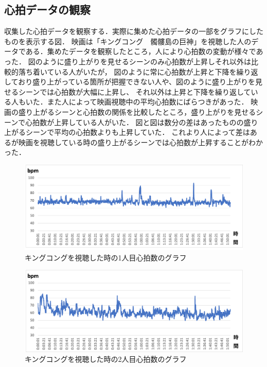 \subsection{心拍データの観察}

収集した心拍データを観察する．実際に集めた心拍データの一部をグラフにしたものを表示する図．
映画は「キングコング　髑髏島の巨神」を視聴した人のデータである．集めたデータを観察したところ，人により心拍数の変動が様々であった．
図のように盛り上がりを見せるシーンのみ心拍数が上昇しそれ以外は比較的落ち着いている人がいたが，
図のように常に心拍数が上昇と下降を繰り返しており盛り上がっている箇所が把握できない人や、図のように盛り上がりを見せるシーンでは心拍数が大幅に上昇し、
それ以外は上昇と下降を繰り返している人もいた．また人によって映画視聴中の平均心拍数にばらつきがあった．
映画の盛り上がるシーンと心拍数の関係を比較したところ，盛り上がりを見せるシーンで心拍数が上昇している人がいた．
図と図は数分の差はあったものの盛り上がるシーンで平均の心拍数よりも上昇していた．
これより人によって差はあるが映画を視聴している時の盛り上がるシーンでは心拍数が上昇することがわかった．

\begin{figure}[H]
    \centering
    \includegraphics[width=16cm]{images/chapter3/gurafu2.png}
    \caption{キングコングを視聴した時の1人目心拍数のグラフ}
\end{figure}

\begin{figure}[H]
    \centering
    \includegraphics[width=16cm]{images/chapter3/gurafu.png}
    \caption{キングコングを視聴した時の2人目心拍数のグラフ}
\end{figure}

